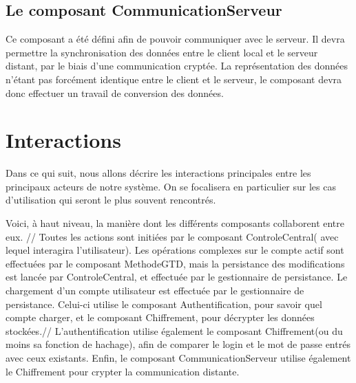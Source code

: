 \subsection{Le composant CommunicationServeur}

Ce composant a été défini afin de pouvoir communiquer avec le serveur.
Il devra permettre la synchronisation des données entre le client local et le serveur distant, par le biais d'une communication cryptée.
La représentation des données n'étant pas forcément identique entre le client et le serveur, le composant devra donc effectuer un travail de conversion des données.




\section{Interactions}

Dans ce qui suit, nous allons décrire les interactions principales entre les principaux acteurs de notre système.
On se focalisera en particulier sur les cas d'utilisation qui seront le plus souvent rencontrés.

Voici, à haut niveau, la manière dont les différents composants collaborent entre eux.
// 
Toutes les actions sont initiées par le composant ControleCentral( avec lequel interagira l'utilisateur). Les opérations complexes sur le compte actif sont effectuées par le composant MethodeGTD, mais la persistance des modifications est lancée par ControleCentral, et effectuée par le gestionnaire de persistance.
Le chargement d'un compte utilisateur est effectuée par le gestionnaire de persistance. Celui-ci utilise le composant Authentification, pour savoir quel compte charger, et le composant Chiffrement, pour décrypter les données stockées.//
L'authentification utilise également le composant Chiffrement(ou du moins sa fonction de hachage), afin de comparer le login et le mot de passe entrés avec ceux existants.
Enfin, le composant CommunicationServeur utilise également le Chiffrement pour crypter la communication distante.





